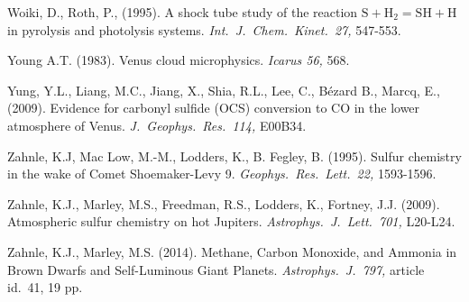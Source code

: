 \documentclass[preprint]{aastex}
\newcounter{reaction}
\begin{document}
\begin{thebibliography}{00}
Woiki, D., Roth, P., (1995).
A shock tube study of the reaction $\mathrm{S} + \mathrm{H}_2 = \mathrm{SH} + \mathrm{H}$ in pyrolysis and photolysis systems.
{\em Int.\ J.\ Chem.\ Kinet.\ 27,}  547-553.


Young A.T. (1983).
Venus cloud microphysics.
 {\em Icarus 56,} 568.

Yung, Y.L., Liang, M.C., Jiang, X., Shia, R.L., Lee, C., B{\'e}zard B.,  Marcq, E., (2009).
Evidence for carbonyl sulfide (OCS) conversion to CO in the lower atmosphere of Venus.
{\em J.\ Geophys.\ Res.\ 114,} E00B34. %

Zahnle, K.J, Mac Low, M.-M., Lodders, K., B. Fegley, B. (1995). 
Sulfur chemistry in the wake of Comet Shoemaker-Levy 9.
{\em Geophys.\ Res.\ Lett.\ 22,} 1593-1596.

Zahnle, K.J., Marley, M.S., Freedman, R.S., Lodders, K., Fortney, J.J. (2009).
Atmospheric sulfur chemistry on hot Jupiters.  {\em Astrophys.\ J.\ Lett.\ 701,} L20-L24.

Zahnle, K.J., Marley, M.S. (2014).
Methane, Carbon Monoxide, and Ammonia in Brown Dwarfs and Self-Luminous Giant Planets.
{\em Astrophys.\ J.\ 797,} article id.\ 41, 19 pp.

 \end{thebibliography}

\small


\clearpage

\newpage
\end{document}
